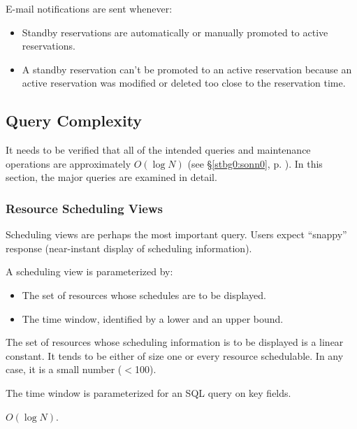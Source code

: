 \documentclass[letterpaper,10pt,titlepage]{article}
\begin{document}
E-mail notifications are sent whenever:

\begin{itemize}
\item Standby reservations are automatically or manually
      promoted to active reservations.
\item A standby reservation can't be promoted to an active reservation
      because an active reservation was modified or deleted too close
      to the reservation time.
\end{itemize}


\subsection{Query Complexity}
\label{stdd0:sqcx0}

It needs to be verified that all of the intended queries and maintenance
operations are approximately $O(\log N)$ (see \S{}\ref{stbg0:sonn0}, p.
\pageref{stbg0:sonn0}).  In this section, the major queries are
examined in detail.



\subsubsection{Resource Scheduling Views}
\label{stdd0:sqcx0:ssvw0}

Scheduling views are perhaps the most important query.  Users expect
``snappy'' response (near-instant display of scheduling information).

A scheduling view is parameterized by:

\begin{itemize}
\item The set of resources whose schedules are to be displayed.
\item The time window, identified by a lower and an upper bound.
\end{itemize}

The set of resources whose scheduling information is to be displayed is a
linear constant.  It tends to be either of size one or every resource schedulable.
In any case, it is a small number ($<$100).

The time window is parameterized for an SQL query on key fields.

$O(\log N)$.
\end{document}
